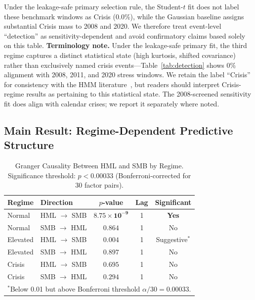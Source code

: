 \documentclass[sigconf,anonymous]{acmart}
\begin{document}
Under the leakage-safe primary selection rule, the Student-$t$ fit does not
label these benchmark windows as Crisis (0.0\%), while the Gaussian baseline
assigns substantial Crisis mass to 2008 and 2020. We therefore treat event-level
``detection'' as sensitivity-dependent and avoid confirmatory claims based solely
on this table.
\textbf{Terminology note.} Under the leakage-safe primary fit, the third regime
captures a distinct statistical state (high kurtosis, shifted covariance) rather
than exclusively named crisis events---Table~\ref{tab:detection} shows 0\% alignment
with 2008, 2011, and 2020 stress windows. We retain the label ``Crisis'' for
consistency with the HMM literature~\cite{bulla2011hidden}, but readers should
interpret Crisis-regime results as pertaining to this statistical state. The
2008-screened sensitivity fit does align with calendar crises; we report it
separately where noted.

\subsection{Main Result: Regime-Dependent Predictive Structure}
\label{sec:main_result}

\begin{table}[t]
\centering
\caption{Granger Causality Between HML and SMB by Regime. Significance threshold:
$p < 0.00033$ (Bonferroni-corrected for 30 factor pairs).}
\label{tab:main}
\small
\begin{tabular}{llccc}
\toprule
Regime & Direction & $p$-value & Lag & Significant \\
\midrule
Normal & HML $\to$ SMB & $\mathbf{8.75 \times 10^{-9}}$ & 1 & \textbf{Yes} \\
Normal & SMB $\to$ HML & $0.864$ & 1 & No \\
\midrule
Elevated & HML $\to$ SMB & $0.004$ & 1 & Suggestive$^*$ \\
Elevated & SMB $\to$ HML & $0.897$ & 1 & No \\
\midrule
Crisis & HML $\to$ SMB & $0.695$ & 1 & No \\
Crisis & SMB $\to$ HML & $0.294$ & 1 & No \\
\bottomrule
\multicolumn{5}{l}{\footnotesize $^*$Below 0.01 but above Bonferroni threshold $\alpha/30 = 0.00033$.}
\end{tabular}
\end{table}
\end{document}
